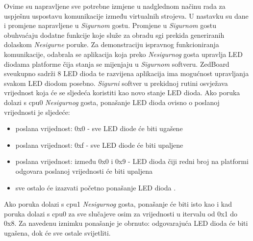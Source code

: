 \documentclass[times, utf8, diplomski, numeric]{fer}
\begin{document}
Ovime su napravljene sve potrebne izmjene u nadglednom načinu rada za uspješnu uspostavu komunikacije između virtualnih
strojeva. U nastavku su dane i promjene napravljene u \textit{Sigurnom} gostu. Promjene u \textit{Sigurnom} gostu
obuhvaćaju dodatne funkcije koje služe za obradu \gls{sgi} prekida generiranih dolaskom \textit{Nesigurne} poruke. Za
demonstraciju ispravnog funkcioniranja komunikacije, odabrala se aplikacija koja preko \textit{Nesigurnog} gosta upravlja
LED diodama platforme čija stanja se mijenjaju u \textit{Sigurnom} softveru. ZedBoard sveukupno sadrži 8 LED dioda te
razvijena aplikacija ima mogućnost upravljanja svakom LED diodom posebno. \textit{Sigurni} softver u prekidnoj rutini
osvježava vrijednost koja će se sljedeća koristiti kao novo stanje LED dioda. Ako poruka dolazi s \gls{cpu}0 \textit{Nesigurnog}
gosta, ponašanje LED dioda ovisno o poslanoj vrijednosti je sljedeće:
\begin{itemize}
  \item{poslana vrijednost: 0x0 - sve LED diode će biti ugašene}
  \item{poslana vrijednost: 0xf - sve LED diode će biti upaljene}
  \item{poslana vrijednost: između 0x0 i 0x9 - LED dioda čiji redni broj na platformi odgovara poslanoj vrijednosti će biti
  upaljena}
  \item{sve ostalo će izazvati početno ponašanje LED dioda .}
\end{itemize}
Ako poruka dolazi s \gls{cpu}1 \textit{Nesigurnog} gosta, ponašanje će biti isto kao i kad poruka dolazi s \gls{cpu}0 za sve slučajeve
osim za vrijednosti u itervalu od 0x1 do 0x8. Za navedenu iznimku ponašanje je obrnuto: odgovarajuća LED dioda će biti
ugašena, dok će sve ostale svijetliti.
\end{document}
